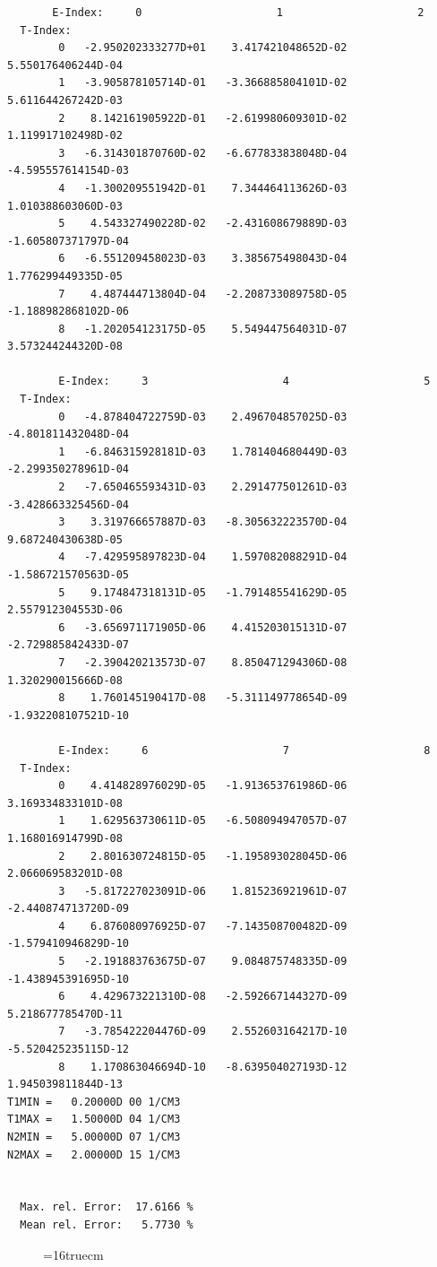 \documentclass[12pt,dvipdfmx]{article}
\begin{document}
\begin{small}\begin{verbatim}
       E-Index:     0                     1                     2
  T-Index:
        0   -2.950202333277D+01    3.417421048652D-02    5.550176406244D-04
        1   -3.905878105714D-01   -3.366885804101D-02    5.611644267242D-03
        2    8.142161905922D-01   -2.619980609301D-02    1.119917102498D-02
        3   -6.314301870760D-02   -6.677833838048D-04   -4.595557614154D-03
        4   -1.300209551942D-01    7.344464113626D-03    1.010388603060D-03
        5    4.543327490228D-02   -2.431608679889D-03   -1.605807371797D-04
        6   -6.551209458023D-03    3.385675498043D-04    1.776299449335D-05
        7    4.487444713804D-04   -2.208733089758D-05   -1.188982868102D-06
        8   -1.202054123175D-05    5.549447564031D-07    3.573244244320D-08

        E-Index:     3                     4                     5
  T-Index:
        0   -4.878404722759D-03    2.496704857025D-03   -4.801811432048D-04
        1   -6.846315928181D-03    1.781404680449D-03   -2.299350278961D-04
        2   -7.650465593431D-03    2.291477501261D-03   -3.428663325456D-04
        3    3.319766657887D-03   -8.305632223570D-04    9.687240430638D-05
        4   -7.429595897823D-04    1.597082088291D-04   -1.586721570563D-05
        5    9.174847318131D-05   -1.791485541629D-05    2.557912304553D-06
        6   -3.656971171905D-06    4.415203015131D-07   -2.729885842433D-07
        7   -2.390420213573D-07    8.850471294306D-08    1.320290015666D-08
        8    1.760145190417D-08   -5.311149778654D-09   -1.932208107521D-10

        E-Index:     6                     7                     8
  T-Index:
        0    4.414828976029D-05   -1.913653761986D-06    3.169334833101D-08
        1    1.629563730611D-05   -6.508094947057D-07    1.168016914799D-08
        2    2.801630724815D-05   -1.195893028045D-06    2.066069583201D-08
        3   -5.817227023091D-06    1.815236921961D-07   -2.440874713720D-09
        4    6.876080976925D-07   -7.143508700482D-09   -1.579410946829D-10
        5   -2.191883763675D-07    9.084875748335D-09   -1.438945391695D-10
        6    4.429673221310D-08   -2.592667144327D-09    5.218677785470D-11
        7   -3.785422204476D-09    2.552603164217D-10   -5.520425235115D-12
        8    1.170863046694D-10   -8.639504027193D-12    1.945039811844D-13
T1MIN =   0.20000D 00 1/CM3
T1MAX =   1.50000D 04 1/CM3
N2MIN =   5.00000D 07 1/CM3
N2MAX =   2.00000D 15 1/CM3


  Max. rel. Error:  17.6166 %
  Mean rel. Error:   5.7730 %

\end{verbatim}\end{small}
\begin{figure} \label{2.3.8A0}
\epsfxsize=16truecm 
\end{figure}
\newpage
\end{document}
